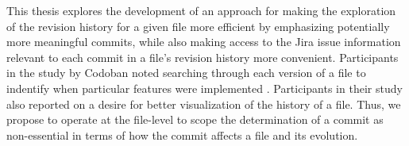 This thesis explores the development of an approach for making the exploration of the revision history 
for a given file more efficient by emphasizing potentially more meaningful commits, while also making 
access to the Jira issue information relevant to each commit in a file's revision history more convenient.
Participants in the study by Codoban \etal noted searching through
each version of a file to indentify when particular features were
implemented \cite{codoban_software_2015}. 
Participants in their study also reported on a desire for 
better visualization of the history of a file.
Thus, we propose to operate at the file-level to scope the determination of
a commit as non-essential in terms of how the commit affects a file and
its evolution.

\endinput

Any text after an \endinput is ignored.
You could put scraps here or things in progress.